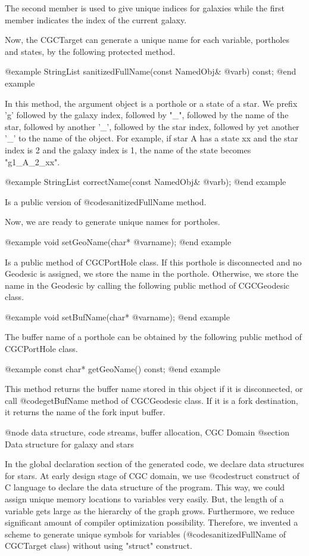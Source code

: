 {The second member is used to give unique indices for galaxies while the
first member indicates the index of the current galaxy.

Now, the CGCTarget can generate a unique name for each variable,
portholes and states, by the following protected method.

@example
StringList sanitizedFullName(const NamedObj& @var{b}) const;
@end example

In this method, the argument object is a porthole or a state of a star.
We prefix 'g' followed by the galaxy index, followed by "_", followed
by the name of the star, followed by another '_', followed by the star
index, followed by yet another '_' to the name of the object. For example,
if star A has a state xx and the star index is 2 and the galaxy index is 1,
the name of the state becomes "g1_A_2_xx".

@example
StringList correctName(const NamedObj& @var{b});
@end example

Is a public version of @code{sanitizedFullName} method.

Now, we are ready to generate unique names for portholes.

@example
void setGeoName(char* @var{name});
@end example

Is a public method of CGCPortHole class. If this porthole is disconnected
and no Geodesic is assigned, we store the name in the porthole. Otherwise,
we store the name in the Geodesic by calling the following public method
of CGCGeodesic class.

@example
void setBufName(char* @var{name});
@end example

The buffer name of a porthole can be obtained by the following public
method of CGCPortHole class.

@example
const char* getGeoName() const;
@end example

This method returns the buffer name stored in this object if it is
disconnected, or call @code{getBufName} method of CGCGeodesic class.
If it is a fork destination, it returns the name of the fork input buffer.

@node data structure, code streams, buffer allocation, CGC Domain
@section Data structure for galaxy and stars

In the global declaration section of the generated code, we declare
data structures for stars. At early design stage of CGC domain, we use
@code{struct} construct of C language to declare the data structure of
the program. This way, we could assign unique memory locations to variables
very easily. But, the length of a variable gets large as the hierarchy of
the graph grows. Furthermore, we reduce significant amount of
compiler optimization possibility. Therefore, we invented a scheme to generate
unique symbols for variables (@code{sanitizedFullName} of CGCTarget class)
without using "struct" construct.

}
